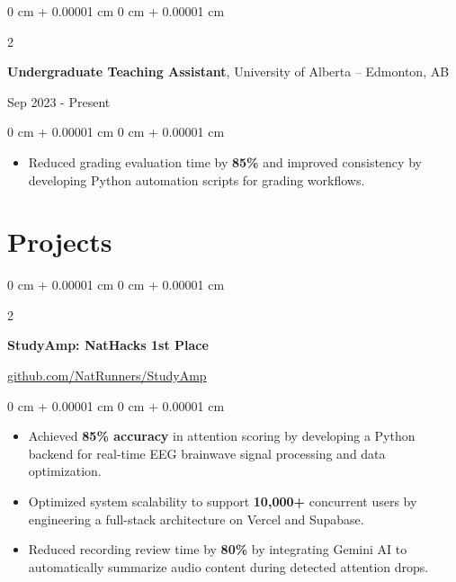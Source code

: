 \documentclass[10pt, letterpaper]{article}
\newenvironment{onecolentry}{
    \begin{adjustwidth}{
        0 cm + 0.00001 cm
    }{
        0 cm + 0.00001 cm
    }
}{
    \end{adjustwidth}
}
\newenvironment{twocolentry}[2][]{
    \onecolentry
    \def\secondColumn{#2}
    \setcolumnwidth{\fill, 6 cm}
    \begin{paracol}{2}
}{
    \switchcolumn \raggedleft \secondColumn
    \end{paracol}
    \endonecolentry
}
\begin{document}
    \vspace{0.10 cm}

    \begin{twocolentry}{Sep 2023 - Present}
        \textbf{Undergraduate Teaching Assistant}, University of Alberta -- Edmonton, AB
    \end{twocolentry}

   \vspace{0.10 cm}
    \begin{onecolentry}
        \begin{itemize}[leftmargin=2em, itemsep=1pt, parsep=0pt, topsep=0pt, partopsep=0pt]
            \item Reduced grading evaluation time by \textbf{85\%} and improved consistency by developing Python automation scripts for grading workflows.
        \end{itemize}
    \end{onecolentry}

    \vspace{0.10 cm}
    \section{Projects}

    \begin{twocolentry}{\href{https://github.com/NatRunners/StudyAmp}{github.com/NatRunners/StudyAmp}}
        \textbf{StudyAmp: NatHacks 1st Place}
    \end{twocolentry}

    \vspace{0.10 cm}
    \begin{onecolentry}
        \begin{itemize}[leftmargin=2em, itemsep=1pt, parsep=0pt, topsep=0pt, partopsep=0pt]
            \item Achieved \textbf{85\% accuracy} in attention scoring by developing a Python backend for real-time EEG brainwave signal processing and data optimization.
            \item Optimized system scalability to support \textbf{10,000+} concurrent users by engineering a full-stack architecture on Vercel and Supabase.
            \item Reduced recording review time by \textbf{80\%} by integrating Gemini AI to automatically summarize audio content during detected attention drops.
        \end{itemize}
    \end{onecolentry}
\end{document}
